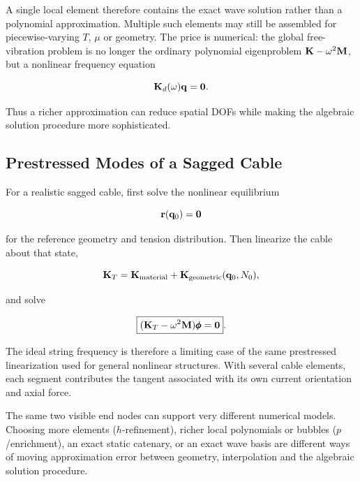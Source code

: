 A single local element therefore contains the exact wave solution rather than a
polynomial approximation.  Multiple such elements may still be assembled for
piecewise-varying $T$, $\mu$ or geometry.  The price is numerical: the global
free-vibration problem is no longer the ordinary polynomial eigenproblem
$\mathbf{K}-\omega^2\mathbf{M}$, but a nonlinear frequency equation

\begin{equation}
    \mathbf{K}_d(\omega)\mathbf{q}=\mathbf{0}.
\end{equation}

Thus a richer approximation can reduce spatial DOFs while making the algebraic
solution procedure more sophisticated.

\subsection{Prestressed Modes of a Sagged Cable}

For a realistic sagged cable, first solve the nonlinear equilibrium

\begin{equation}
    \mathbf{r}(\mathbf{q}_0)=\mathbf{0}
\end{equation}

for the reference geometry and tension distribution.  Then linearize the cable
about that state,

\begin{equation}
    \mathbf{K}_{T}
    =\mathbf{K}_{\mathrm{material}}
    +\mathbf{K}_{\mathrm{geometric}}(\mathbf{q}_0,N_0),
\end{equation}

and solve

\begin{equation}
    \boxed{
    (\mathbf{K}_{T}-\omega^2\mathbf{M})\pmb{\phi}=\mathbf{0}
    }.
\end{equation}

The ideal string frequency is therefore a limiting case of the same prestressed
linearization used for general nonlinear structures.  With several cable
elements, each segment contributes the tangent associated with its own current
orientation and axial force.

\begin{notebooknote}

The same two visible end nodes can support very different numerical models.
Choosing more elements ($h$-refinement), richer local polynomials or bubbles
($p$/enrichment), an exact static catenary, or an exact wave basis are different
ways of moving approximation error between geometry, interpolation and the
algebraic solution procedure.
\end{notebooknote}


